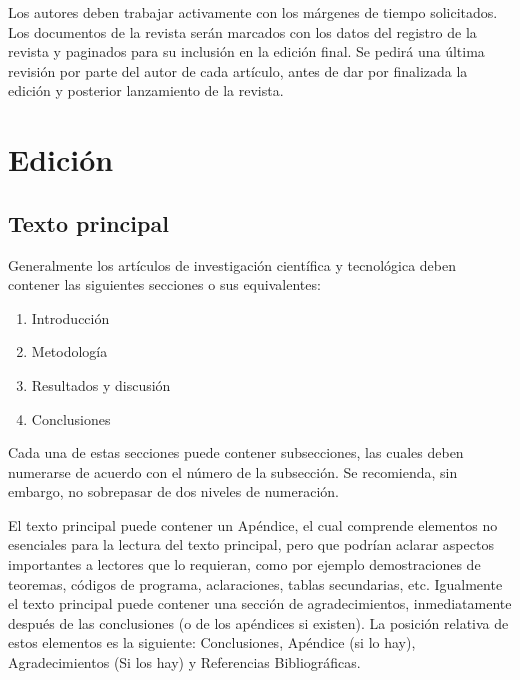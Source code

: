 \documentclass[a4paper,10pt,twoside]{article}
\begin{document}
Los autores deben trabajar activamente con los márgenes de tiempo solicitados. Los documentos de la revista serán marcados con los datos del registro de la revista y paginados para su inclusión en la edición final. Se pedirá una última revisión por parte del autor de cada artículo, antes de dar por finalizada la edición y posterior lanzamiento de la revista.



\section{Edición}
  
  \subsection{Texto principal}
  
  Generalmente los artículos de investigación científica y tecnológica deben contener las siguientes secciones o sus equivalentes:
  
  \begin{enumerate}
   \item Introducción
   \item Metodología
   \item Resultados y discusión
   \item Conclusiones
  \end{enumerate}
  
  Cada una de estas secciones puede contener subsecciones, las cuales deben numerarse de acuerdo con el número de la subsección. Se recomienda, sin embargo, no sobrepasar de dos niveles de numeración.
   
  El texto principal puede contener un Apéndice, el cual comprende elementos no esenciales para la lectura del texto principal, pero que podrían aclarar aspectos importantes a lectores que lo requieran, como por ejemplo demostraciones de teoremas, códigos de programa, aclaraciones, tablas secundarias, etc. Igualmente el texto principal puede contener una sección de agradecimientos, inmediatamente después de las conclusiones (o de los apéndices si existen). La posición relativa de estos elementos es la siguiente: Conclusiones, Apéndice (si lo hay), Agradecimientos (Si los hay) y Referencias Bibliográficas.
  
\end{document}
